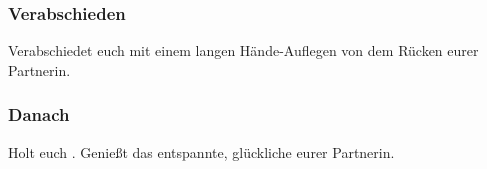 \subsubsection{Verabschieden}

Verabschiedet euch mit einem langen Hände-Auflegen von dem Rücken eurer Partnerin.

\subsubsection{Danach}
 Holt euch . Genießt das entspannte, glückliche  eurer Partnerin.
